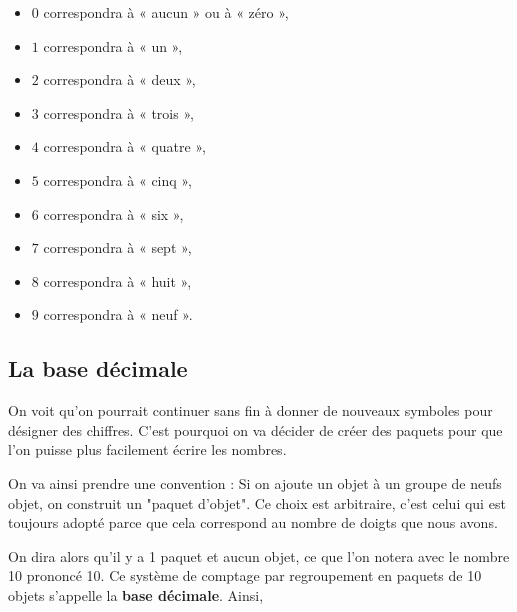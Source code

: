 \begin{minipage}{0.49\linewidth}
\begin{itemize}
\item $0$ correspondra à « aucun » ou à « zéro »,
\item $1$ correspondra à « un »,
\item $2$ correspondra à « deux »,
\item $3$ correspondra à « trois »,
\item $4$ correspondra à « quatre »,
\end{itemize}
\end{minipage}
\begin{minipage}{0.49\linewidth}
\begin{itemize}
\item $5$ correspondra à « cinq »,
\item $6$ correspondra à « six »,
\item $7$ correspondra à « sept »,
\item $8$ correspondra à « huit »,
\item $9$ correspondra à « neuf ».
\end{itemize}
\end{minipage}

\subsection{La base décimale}
On voit qu'on pourrait continuer sans fin à donner de nouveaux symboles pour désigner des chiffres. C'est pourquoi on va décider de créer des paquets pour que l'on puisse plus facilement écrire les nombres.

On va ainsi prendre une convention : Si on ajoute un objet à un groupe de neufs objet, on construit un "paquet d'objet". Ce choix est arbitraire, c'est celui qui est toujours adopté parce que cela correspond au nombre de doigts que nous avons.

On dira alors qu'il y a 1 paquet et aucun objet, ce que l'on notera avec le nombre 10 prononcé 10. Ce système de comptage par regroupement en paquets de 10 objets s'appelle la \textbf{base décimale}. Ainsi,

